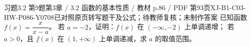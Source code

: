 \par\noindent\begin{minipage}{\linewidth}
\begin{bankitem}{习题3.2 第9题}{第3章 / 3.2 函数的基本性质 / 教材 p.86 / PDF 第93页}{XJ-B1-C03-HW-P086-Y0708}{已对照原页转写题干及公式；待教师复核；未制作答案}
已知函数 $f(x)=\dfrac x{x-a}$。
若 $a=-2$，证明：$f(x)$ 在 $(-\infty,-2)$ 上单调递增；
若 $a>0$，且 $f(x)$ 在 $(1,+\infty)$ 上单调递减，求 $a$ 的取值范围。
\end{bankitem}
\end{minipage}\par\medskip
